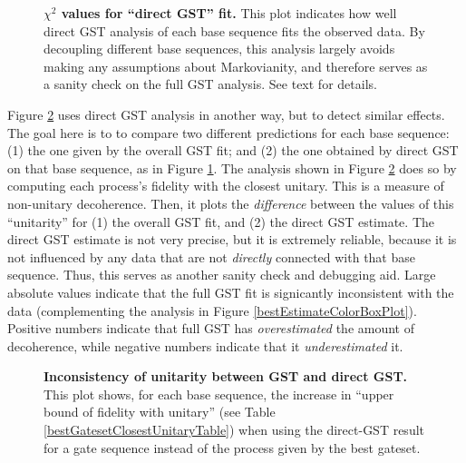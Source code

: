 {\begin{figure}
\begin{center}
\caption{\textbf{$\chi^2$ values for ``direct GST'' fit.}  This plot indicates how well direct GST analysis of each base sequence fits the observed data.  By decoupling different base sequences, this analysis largely avoids making any assumptions about Markovianity, and therefore serves as a sanity check on the full GST analysis.  See text for details.\label{directLSGSTChi2BoxPlot}}
\end{center}
\end{figure}

Figure \ref{directLSGSTDeviationBoxPlot} uses direct GST analysis in another way, but to detect similar effects.   The goal here is to to compare two different predictions for each base sequence:  (1) the one given by the overall GST fit; and (2) the one obtained by direct GST on that base sequence, as in Figure \ref{directLSGSTChi2BoxPlot}.  The analysis shown in Figure \ref{directLSGSTDeviationBoxPlot} does so by computing each process's fidelity with the closest unitary.  This is a measure of non-unitary decoherence.  Then, it plots the \emph{difference} between the values of this ``unitarity'' for (1) the overall GST fit, and (2) the direct GST estimate.  The direct GST estimate is not very precise, but it is extremely reliable, because it is not influenced by any data that are not \emph{directly} connected with that base sequence.  Thus, this serves as another sanity check and debugging aid.  Large absolute values indicate that the full GST fit is signicantly inconsistent with the data (complementing the analysis in Figure \ref{bestEstimateColorBoxPlot}).  Positive numbers indicate that full GST has \emph{overestimated} the amount of decoherence, while negative numbers indicate that it \emph{underestimated} it.

\begin{figure}
\begin{center}
\caption{\textbf{Inconsistency of unitarity between GST and direct GST.}  This plot shows, for each base sequence, the increase in ``upper bound of fidelity with unitary'' (see Table \ref{bestGatesetClosestUnitaryTable}) when using the direct-GST result for a gate sequence instead of the process given by the best gateset.\label{directLSGSTDeviationBoxPlot}}
\end{center}
\end{figure}

}
